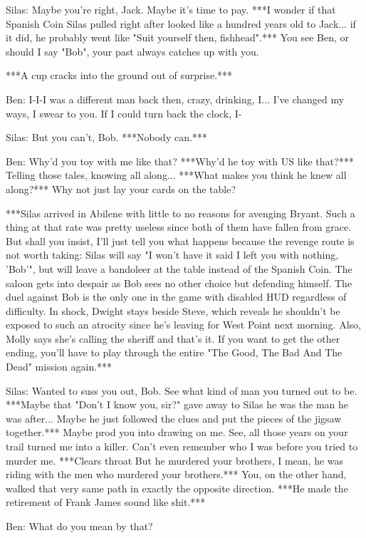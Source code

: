 \documentclass{article}
\begin{document}
Silas: Maybe you're right, Jack. Maybe it's time to pay. ***I wonder if that Spanish Coin Silas pulled right after looked like a hundred years old to Jack... if it did, he probably went like "Suit yourself then, fishhead".*** You see Ben, or should I say "Bob", your past always catches up with you.

***A cup cracks into the ground out of surprise.***

Ben: I-I-I was a different man back then, crazy, drinking, I... I've changed my ways, I swear to you. If I could turn back the clock, I-

Silas: But you can't, Bob. ***Nobody can.***

Ben: Why'd you toy with me like that? ***Why'd he toy with US like that?*** Telling those tales, knowing all along... ***What makes you think he knew all along?*** Why not just lay your cards on the table?

***Silas arrived in Abilene with little to no reasons for avenging Bryant. Such a thing at that rate was pretty useless since both of them have fallen from grace. But shall you insist, I'll just tell you what happens because the revenge route is not worth taking: Silas will say "I won't have it said I left you with nothing, 'Bob'", but will leave a bandoleer at the table instead of the Spanish Coin. The saloon gets into despair as Bob sees no other choice but defending himself. The duel against Bob is the only one in the game with disabled HUD regardless of difficulty. In shock, Dwight stays beside Steve, which reveals he shouldn't be exposed to such an atrocity since he's leaving for West Point next morning. Also, Molly says she's calling the sheriff and that's it. If you want to get the other ending, you'll have to play through the entire "The Good, The Bad And The Dead" mission again.***

Silas: Wanted to suss you out, Bob. See what kind of man you turned out to be. ***Maybe that "Don't I know you, sir?" gave away to Silas he was the man he was after... Maybe he just followed the clues and put the pieces of the jigsaw together.*** Maybe prod you into drawing on me. See, all those years on your trail turned me into a killer. Can't even remember who I was before you tried to murder me. ***{Clears throat} But he murdered your brothers, I mean, he was riding with the men who murdered your brothers.*** You, on the other hand, walked that very same path in exactly the opposite direction. ***He made the retirement of Frank James sound like shit.***

Ben: What do you mean by that?
\end{document}
